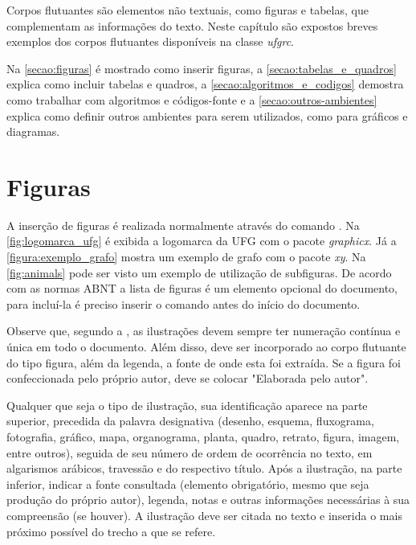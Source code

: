 
Corpos flutuantes são elementos não textuais, como figuras e tabelas, que complementam as informações do texto. Neste capítulo são expostos breves exemplos dos corpos flutuantes disponíveis na classe \textit{ufgrc}.

Na \autoref{secao:figuras} é mostrado como inserir figuras, a \autoref{secao:tabelas_e_quadros} explica como incluir tabelas e quadros, a \autoref{secao:algoritmos_e_codigos} demostra como trabalhar com algoritmos e códigos-fonte e a \autoref{secao:outros-ambientes} explica como definir outros ambientes para serem utilizados, como para gráficos e diagramas.

\section{Figuras}
\label{secao:figuras}

A inserção de figuras é realizada normalmente através do comando . Na \autoref{fig:logomarca_ufg} é exibida a logomarca da UFG com o pacote \textit{graphicx}. Já a \autoref{figura:exemplo_grafo} mostra um exemplo de grafo com o pacote \textit{xy}. Na \autoref{fig:animals} pode ser visto um exemplo de utilização de subfiguras. De acordo com as normas ABNT a lista de figuras é um elemento opcional do documento, para incluí-la é preciso inserir o comando  antes do início do documento.

Observe que, segundo a , as
ilustrações devem sempre ter numeração contínua e única em todo o documento. Além disso, deve ser incorporado ao corpo flutuante do tipo figura, além da legenda, a fonte de onde esta foi extraída. Se a figura foi confeccionada pelo próprio autor, deve se colocar "Elaborada pelo autor".

\begin{citacao}
Qualquer que seja o tipo de ilustração, sua identificação aparece na parte
superior, precedida da palavra designativa (desenho, esquema, fluxograma,
fotografia, gráfico, mapa, organograma, planta, quadro, retrato, figura,
imagem, entre outros), seguida de seu número de ordem de ocorrência no texto,
em algarismos arábicos, travessão e do respectivo título. Após a ilustração, na
parte inferior, indicar a fonte consultada (elemento obrigatório, mesmo que
seja produção do próprio autor), legenda, notas e outras informações
necessárias à sua compreensão (se houver). A ilustração deve ser citada no
texto e inserida o mais próximo possível do trecho a que se
refere. \cite[seções 5.8]{NBR14724:2011}
\end{citacao}

